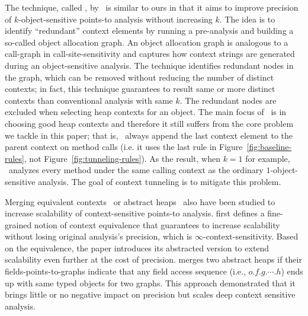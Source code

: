 The technique, called \Bean, by~\citet{TanLX16} is similar to ours in
that it aims to improve precision of $k$-object-sensitive points-to
analysis without increasing $k$. The idea is to identify ``redundant''
context elements by running a pre-analysis and building a so-called
object allocation graph. An object allocation graph is analogous to a
call-graph in call-site-sensitivity and captures how context strings
are generated during an object-sensitive analysis. The technique
identifies redundant nodes in the graph, which can be removed without
reducing the number of distinct contexts; in fact, this technique
guarantees to result same or more distinct contexts than conventional
analysis with same $k$. The redundant nodes are excluded when
selecting heap contexts for an object. The main focus of \Bean~is in
choosing good heap contexts and therefore it still suffers from the
core problem we tackle in this paper; that is, \Bean~always append the
last context element to the parent context on method calls (i.e. it
uses the last rule in Figure~\ref{fig:baseline-rules}, not
Figure~\ref{fig:tunneling-rules}). As the result, when $k=1$ for
example, \Bean~analyzes every method under the same calling context as
the ordinary $1$-object-sensitive analysis. The goal of context
tunneling is to mitigate this problem.

Merging equivalent contexts~\cite{Xu2008} or abstract heaps~\cite{Tan2017} also have been studied to
increase scalability of context-sensitive points-to analysis. \citet{Xu2008} first defines a fine-grained
notion of context equivalence that guarantees to increase scalability without losing original analysis's
precision, which is $\infty$-context-sensitivity. Based on the equivalence, the paper introduces its abstracted
version to extend scalability even further at the cost of precision. \citet{Tan2017} merges two
abstract heaps if their fields-points-to-graphs indicate that any field access sequence (i.e.,
$o.f.g.\cdots .h$) ends up with same typed objects for two graphs. This approach demonstrated that it brings
little or no negative impact on precision but scales deep context
sensitive analysis.





